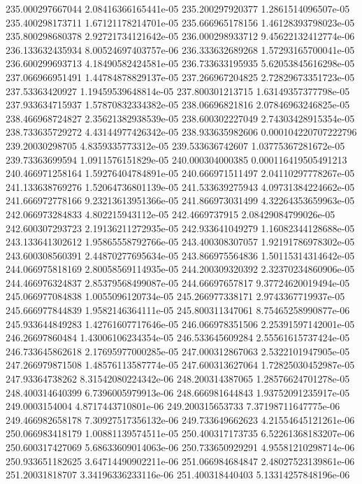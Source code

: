 {235.000297667044 2.08416366165441e-05
235.200297920377 1.2861514096507e-05
235.400298173711 1.67121178214701e-05
235.666965178156 1.46128393798023e-05
235.800298680378 2.92721734121642e-05
236.000298933712 9.45622132412774e-06
236.133632435934 8.00524697403757e-06
236.333632689268 1.57293165700041e-05
236.600299693713 4.18490582424581e-05
236.733633195935 5.62053845616298e-05
237.066966951491 1.44784878829137e-05
237.266967204825 2.72829673351723e-05
237.53363420927 1.19459539648814e-05
237.800301213715 1.63149357377798e-05
237.933634715937 1.57870832334382e-05
238.06696821816 2.07846963246825e-05
238.466968724827 2.35621382938539e-05
238.600302227049 2.74303428915354e-05
238.733635729272 4.43144977426342e-05
238.933635982606 0.000104220707222796
239.20030298705 4.8359335773312e-05
239.533636742607 1.03775367281672e-05
239.73363699594 1.0911576151829e-05
240.000304000385 0.000116419505491213
240.466971258164 1.59276404784891e-05
240.666971511497 2.04110297778267e-05
241.133638769276 1.52064736801139e-05
241.533639275943 4.09731384224662e-05
241.666972778166 9.23213613951366e-05
241.866973031499 4.32264353659963e-05
242.066973284833 4.802215943112e-05
242.4669737915 2.08429084799026e-05
242.600307293723 2.19136211272935e-05
242.933641049279 1.16082344128688e-05
243.133641302612 1.95865558792766e-05
243.400308307057 1.92191786978302e-05
243.600308560391 2.44870277695634e-05
243.866975564836 1.50115314314642e-05
244.066975818169 2.80058569114935e-05
244.200309320392 2.32370234860906e-05
244.466976324837 2.85379568499087e-05
244.66697657817 9.37724620019494e-05
245.066977084838 1.0055096120734e-05
245.266977338171 2.9743367719937e-05
245.666977844839 1.9582146364111e-05
245.800311347061 8.75465258990877e-06
245.933644849283 1.42761607717646e-05
246.066978351506 2.25391597142001e-05
246.26697860484 1.43006106234354e-05
246.533645609284 2.55561615737424e-05
246.733645862618 2.17695977000285e-05
247.000312867063 2.5322101947905e-05
247.266979871508 1.48576113587774e-05
247.600313627064 1.72825030452987e-05
247.93364738262 8.31542080224342e-06
248.200314387065 1.28576624701278e-05
248.400314640399 6.7396005979913e-06
248.666981644843 1.93752091235917e-05
249.0003154004 4.8717443710801e-06
249.200315653733 7.37198711647775e-06
249.466982658178 7.30927517356132e-06
249.733649662623 4.21554645121261e-06
250.066983418179 1.00881139574511e-05
250.400317173735 6.52261368183207e-06
250.600317427069 5.68633609014063e-06
250.733650929291 4.95581210298714e-06
250.933651182625 3.64714490902211e-06
251.066984684847 2.48027523139861e-06
251.20031818707 3.34196336233116e-06
251.400318440403 5.13314257848196e-06
}
